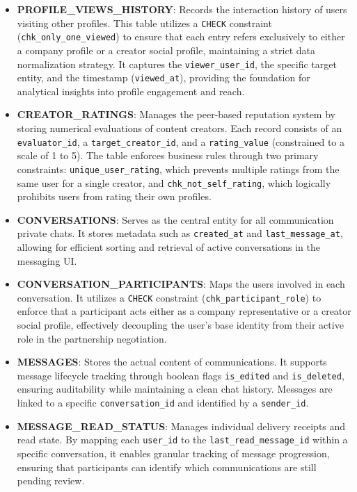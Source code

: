 \begin{itemize}
    \item \textbf{PROFILE\_VIEWS\_HISTORY}: Records the interaction history of users visiting other profiles. This table utilizes a \texttt{CHECK} constraint (\texttt{chk\_only\_one\_viewed}) to ensure that each entry refers exclusively to either a company profile or a creator social profile, maintaining a strict data normalization strategy. It captures the \texttt{viewer\_user\_id}, the specific target entity, and the timestamp (\texttt{viewed\_at}), providing the foundation for analytical insights into profile engagement and reach.

    \item \textbf{CREATOR\_RATINGS}: Manages the peer-based reputation system by storing numerical evaluations of content creators. Each record consists of an \texttt{evaluator\_id}, a \texttt{target\_creator\_id}, and a \texttt{rating\_value} (constrained to a scale of 1 to 5). The table enforces business rules through two primary constraints: \texttt{unique\_user\_rating}, which prevents multiple ratings from the same user for a single creator, and \texttt{chk\_not\_self\_rating}, which logically prohibits users from rating their own profiles.

    \item \textbf{CONVERSATIONS}: Serves as the central entity for all communication private chats. It stores metadata such as \texttt{created\_at} and \texttt{last\_message\_at}, allowing for efficient sorting and retrieval of active conversations in the messaging UI.

    \item \textbf{CONVERSATION\_PARTICIPANTS}: Maps the users involved in each conversation. It utilizes a \texttt{CHECK} constraint (\texttt{chk\_participant\_role}) to enforce that a participant acts either as a company representative or a creator social profile, effectively decoupling the user's base identity from their active role in the partnership negotiation.

    \item \textbf{MESSAGES}: Stores the actual content of communications. It supports message lifecycle tracking through boolean flags \texttt{is\_edited} and \texttt{is\_deleted}, ensuring auditability while maintaining a clean chat history. Messages are linked to a specific \texttt{conversation\_id} and identified by a \texttt{sender\_id}.

    \item \textbf{MESSAGE\_READ\_STATUS}: Manages individual delivery receipts and read state. By mapping each \texttt{user\_id} to the \texttt{last\_read\_message\_id} within a specific conversation, it enables granular tracking of message progression, ensuring that participants can identify which communications are still pending review.


\end{itemize}
